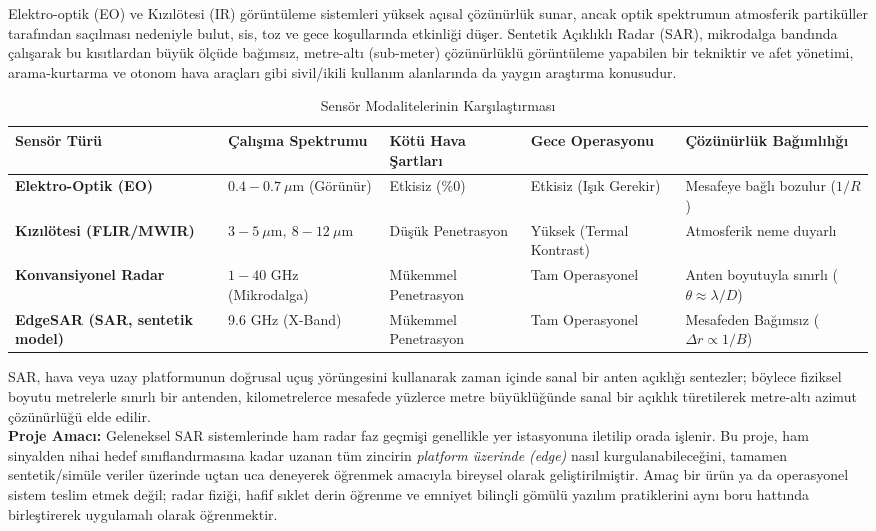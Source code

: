 \documentclass[11pt,a4paper]{article}
\begin{document}
Elektro-optik (EO) ve Kızılötesi (IR) görüntüleme sistemleri yüksek açısal çözünürlük sunar, ancak optik spektrumun atmosferik partiküller tarafından saçılması nedeniyle bulut, sis, toz ve gece koşullarında etkinliği düşer. Sentetik Açıklıklı Radar (SAR), mikrodalga bandında çalışarak bu kısıtlardan büyük ölçüde bağımsız, metre-altı (sub-meter) çözünürlüklü görüntüleme yapabilen bir tekniktir ve afet yönetimi, arama-kurtarma ve otonom hava araçları gibi sivil/ikili kullanım alanlarında da yaygın araştırma konusudur.\\

\begin{table}[htbp]
\centering
\small
\caption{Sensör Modalitelerinin Karşılaştırması}
\label{tab:sensor_comparison}
\begin{tabularx}{\textwidth}{>{\bfseries}p{3.2cm} p{2.6cm} >{\raggedright\arraybackslash}p{2.6cm} >{\raggedright\arraybackslash}p{2.4cm} >{\raggedright\arraybackslash}X}
\toprule
Sensör Türü & Çalışma Spektrumu & Kötü Hava Şartları & Gece Operasyonu & Çözünürlük Bağımlılığı \\
\midrule
Elektro-Optik (EO) & $0.4 - 0.7\ \mu\text{m}$ (Görünür) & Etkisiz (\%0) & Etkisiz (Işık Gerekir) & Mesafeye bağlı bozulur ($1/R$) \\
Kızılötesi (FLIR/MWIR) & $3 - 5\ \mu\text{m},\ 8 - 12\ \mu\text{m}$ & Düşük Penetrasyon & Yüksek (Termal Kontrast) & Atmosferik neme duyarlı \\
Konvansiyonel Radar & $1 - 40\text{ GHz}$ (Mikrodalga) & Mükemmel Penetrasyon & Tam Operasyonel & Anten boyutuyla sınırlı ($\theta \approx \lambda/D$) \\
EdgeSAR (SAR, sentetik model) & 9.6 GHz (X-Band) & Mükemmel Penetrasyon & Tam Operasyonel & Mesafeden Bağımsız ($\Delta r \propto 1/B$) \\
\bottomrule
\end{tabularx}
\end{table}

SAR, hava veya uzay platformunun doğrusal uçuş yörüngesini kullanarak zaman içinde sanal bir anten açıklığı sentezler; böylece fiziksel boyutu metrelerle sınırlı bir antenden, kilometrelerce mesafede yüzlerce metre büyüklüğünde sanal bir açıklık türetilerek metre-altı azimut çözünürlüğü elde edilir.\\

\textbf{Proje Amacı:} Geleneksel SAR sistemlerinde ham radar faz geçmişi genellikle yer istasyonuna iletilip orada işlenir. Bu proje, ham sinyalden nihai hedef sınıflandırmasına kadar uzanan tüm zincirin \emph{platform üzerinde (edge)} nasıl kurgulanabileceğini, tamamen sentetik/simüle veriler üzerinde uçtan uca deneyerek öğrenmek amacıyla bireysel olarak geliştirilmiştir. Amaç bir ürün ya da operasyonel sistem teslim etmek değil; radar fiziği, hafif sıklet derin öğrenme ve emniyet bilinçli gömülü yazılım pratiklerini aynı boru hattında birleştirerek uygulamalı olarak öğrenmektir.
\end{document}
